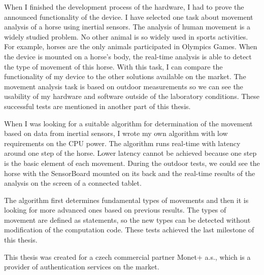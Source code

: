 When I finished the development process of the hardware, I had to prove the announced functionality of the device. I have selected one task about movement analysis of a horse using inertial sensors. The analysis of human movement is a widely studied problem. No other animal is so widely used in sports activities. For example, horses are the only animals participated in Olympics Games. When the device is mounted on a horse's body, the real-time analysis is able to detect the type of movement of this horse. With this task, I can compare the functionality of my device to the other solutions available on the market. The movement analysis task is based on outdoor measurements so we can see the usability of my hardware and software outside of the laboratory conditions. These successful tests are mentioned in another part of this thesis.

When I was looking for a suitable algorithm for determination of the movement based on data from inertial sensors, I wrote my own algorithm with low requirements on the CPU power. The algorithm runs real-time with latency around one step of the horse. Lower latency cannot be achieved because one step is the basic element of each movement. During the outdoor tests, we could see the horse with the SensorBoard mounted on its back and the real-time results of the analysis on the screen of a connected tablet.

The algorithm first determines fundamental types of movements and then it is looking for more advanced ones based on previous results. The types of movement are defined as statements, so the new types can be detected without modification of the computation code. These tests achieved the last milestone of this thesis.

This thesis was created for a czech commercial partner Monet+ a.s., which is a provider of authentication services on the market.
